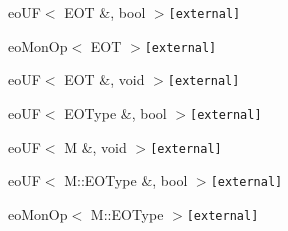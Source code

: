 \begin{CompactList}
\begin{CompactList}
\begin{CompactList}
\item {}
\begin{CompactList}
\item {}
\item {}
\end{CompactList}
\end{CompactList}
\item eo\-UF$<$ EOT \&, bool $>${\tt  [external]}\begin{CompactList}
\item eo\-Mon\-Op$<$ EOT $>${\tt  [external]}\begin{CompactList}
\item {}
\end{CompactList}
\end{CompactList}
\item eo\-UF$<$ EOT \&, void $>${\tt  [external]}\begin{CompactList}
\item {}
\end{CompactList}
\item eo\-UF$<$ EOType \&, bool $>${\tt  [external]}\item eo\-UF$<$ M \&, void $>${\tt  [external]}\begin{CompactList}
\item {}
\end{CompactList}
\item eo\-UF$<$ M::EOType \&, bool $>${\tt  [external]}\begin{CompactList}
\item eo\-Mon\-Op$<$ M::EOType $>${\tt  [external]}\begin{CompactList}
\item {}
\begin{CompactList}
\item {}
\item {}
\item {}

\end{CompactList}
\end{CompactList}
\end{CompactList}
\end{CompactList}
\end{CompactList}
